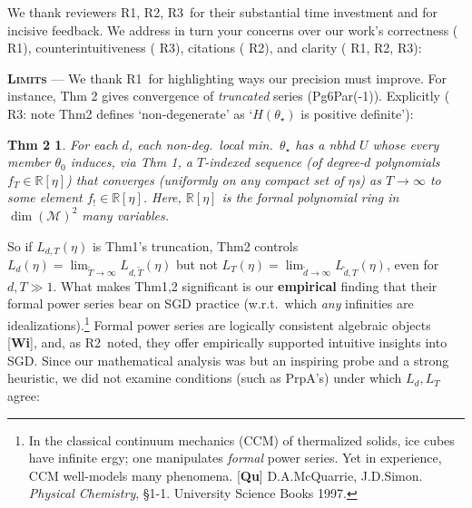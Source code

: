 \documentclass{article}
\newcommand{\Ra}{\textmd{\textsf{\color{purple!50} {R1}}}}
\newcommand{\Rb}{\textmd{\textsf{\color{green!60}  {R2}}}}
\newcommand{\Rc}{\textmd{\textsf{\color{blue!50}   {R3}}}}
\newcommand{\Mm}{\mathcal{M}}
\newcommand{\RR}{\mathbb{R}}
\newcommand{\pag}[1]{\textmd{{\color{gray}Pg}{#1}}}
\newcommand{\pgph}[1]{\textmd{{\color{gray}Par}{#1}}}
\newcommand{\thm}[1]{\textmd{{\color{gray}Thm}{#1}}}
\newcommand{\prp}[1]{\textmd{{\color{gray}Prp}{#1}}}
\newcommand{\cit}[1]{[\textbf{#1}]}
\newcommand{\moosect}[1]{\par\textsc{\textbf{#1}} ---}
\newtheorem*{thm2*}{{Thm 2}}
\begin{document}
    We thank reviewers \Ra, \Rb, \Rc\ for their substantial time investment
    and for incisive feedback.  We address in turn your concerns over
    our work's correctness (\Ra), counterintuitiveness (\Rc), citations (\Rb),
    and clarity (\Ra,\Rb,\Rc): 

\moosect{Limits}
    \newcommand{\LaT}{\Lambda_{\text{\tiny\VarClock}}}
    \newcommand{\Lad}{\Lambda_{\text{\tiny\Thermo{4}}}}
    We thank \Ra\ for highlighting ways our precision must improve.  For
    instance, Thm 2 gives convergence of \emph{truncated} series
    (\pag{6}\pgph{(-1)}).  Explicitly ({\Rc: note \thm{2} defines
    `non-degenerate' as `{$H(\theta_\star)$ is positive definite}'}):
    \begin{thm2*}
        \vspace{-0.25cm}
        For each $d$, each non-deg.\ local min.\ $\theta_\star$ has a
        nbhd $U$ whose every member $\theta_0$ induces, via Thm 1, a
        $T$-indexed sequence (of degree-$d$ polynomials $f_T\in \RR[\eta]$)
        that converges (uniformly on any compact set of $\eta$s) as $T\to
        \infty$ to some element $f_!\in\RR[\eta]$.  Here, $\RR[\eta]$ is the
        formal polynomial ring in $\dim(\Mm)^2$ many variables.
        \vspace{-0.25cm}
    \end{thm2*}
    \noindent
    So if $L_{d,T}(\eta)$ is \thm{1}'s truncation, \thm{2}
    controls $L_d(\eta) = \lim_{\tilde T\to\infty} L_{d,\tilde T}(\eta)$ but not
    $L_T(\eta) = \lim_{\tilde d\to\infty} L_{\tilde d,T}(\eta)$, even for $d,T\gg 1$. 
    What makes \thm{1,2} significant is our \textbf{empirical} finding that
    their formal power series bear on SGD practice (w.r.t.\ which \emph{any}
    infinities are idealizations).\footnote{In the
    classical continuum mechanics (CCM) of thermalized solids, ice cubes have
    infinite ergy; one manipulates \emph{formal} power series.  Yet in
    experience, CCM well-models many phenomena.  \cit{Qu} D.A.McQuarrie,
    J.D.Simon.  \emph{Physical Chemistry}, \S{1-1}.  University Science Books
    1997.}   
    Formal power series are logically consistent algebraic objects \cit{Wi},
    and, as \Rb\ noted, they offer empirically supported intuitive insights into
    SGD. 
    Since our mathematical analysis was but an inspiring probe and a strong
    heuristic, we did not examine conditions (such as \prp{A}'s) under which
    $L_d, L_T$ agree:
\end{document}
